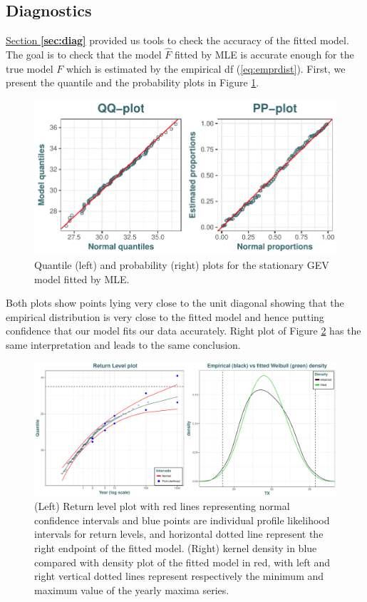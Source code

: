 \subsection{Diagnostics}

\hyperref[sec:diag]{Section \textbf{\ref{sec:diag}}} provided us tools to check the accuracy of the fitted model. The goal is to check that the
model $\hat{F}$ fitted by MLE is accurate enough for the true model $F$ which is estimated by the empirical df
(\ref{eq:emprdist}). First, we present the quantile and the probability plots in Figure \ref{fig:ppqqplot}.

\begin{figure}[!htb]
	\centering	\includegraphics[width=.7\linewidth]{pp_qqplot.pdf}\caption{Quantile (left) and probability (right) plots for the stationary GEV model fitted by MLE.}\label{fig:ppqqplot}
\end{figure}

Both plots show points lying very close to the unit diagonal showing that the empirical distribution
is very close to the fitted model and hence putting confidence that our model fits our data accurately.
Right plot of Figure \ref{fig:rl_empdes} has the same interpretation and leads to the same conclusion.

\begin{figure}[!htb]
	\centering	\includegraphics[width=.75\linewidth]{rl_empdes.pdf}\caption{(Left) Return level plot with red lines representing normal confidence intervals and blue points are individual profile likelihood intervals for return levels, and horizontal dotted line represent the right endpoint of the	fitted model. (Right) kernel density in blue compared with density plot of the fitted model in red, with left and right	vertical dotted lines represent respectively the minimum and maximum value of the yearly maxima series.}\label{fig:rl_empdes}
\end{figure}


